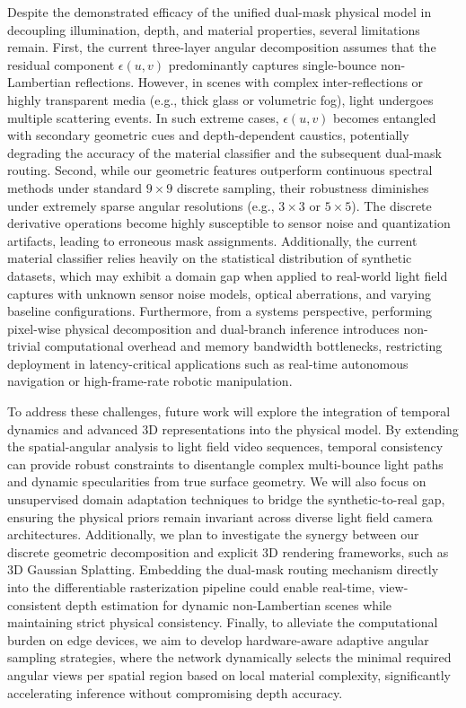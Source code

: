 Despite the demonstrated efficacy of the unified dual-mask physical model in decoupling illumination, depth, and material properties, several limitations remain. First, the current three-layer angular decomposition assumes that the residual component $\epsilon(u,v)$ predominantly captures single-bounce non-Lambertian reflections. However, in scenes with complex inter-reflections or highly transparent media (e.g., thick glass or volumetric fog), light undergoes multiple scattering events. In such extreme cases, $\epsilon(u,v)$ becomes entangled with secondary geometric cues and depth-dependent caustics, potentially degrading the accuracy of the material classifier and the subsequent dual-mask routing. Second, while our geometric features outperform continuous spectral methods under standard $9 \times 9$ discrete sampling, their robustness diminishes under extremely sparse angular resolutions (e.g., $3 \times 3$ or $5 \times 5$). The discrete derivative operations become highly susceptible to sensor noise and quantization artifacts, leading to erroneous mask assignments. Additionally, the current material classifier relies heavily on the statistical distribution of synthetic datasets, which may exhibit a domain gap when applied to real-world light field captures with unknown sensor noise models, optical aberrations, and varying baseline configurations. Furthermore, from a systems perspective, performing pixel-wise physical decomposition and dual-branch inference introduces non-trivial computational overhead and memory bandwidth bottlenecks, restricting deployment in latency-critical applications such as real-time autonomous navigation or high-frame-rate robotic manipulation.

To address these challenges, future work will explore the integration of temporal dynamics and advanced 3D representations into the physical model. By extending the spatial-angular analysis to light field video sequences, temporal consistency can provide robust constraints to disentangle complex multi-bounce light paths and dynamic specularities from true surface geometry. We will also focus on unsupervised domain adaptation techniques to bridge the synthetic-to-real gap, ensuring the physical priors remain invariant across diverse light field camera architectures. Additionally, we plan to investigate the synergy between our discrete geometric decomposition and explicit 3D rendering frameworks, such as 3D Gaussian Splatting. Embedding the dual-mask routing mechanism directly into the differentiable rasterization pipeline could enable real-time, view-consistent depth estimation for dynamic non-Lambertian scenes while maintaining strict physical consistency. Finally, to alleviate the computational burden on edge devices, we aim to develop hardware-aware adaptive angular sampling strategies, where the network dynamically selects the minimal required angular views per spatial region based on local material complexity, significantly accelerating inference without compromising depth accuracy.